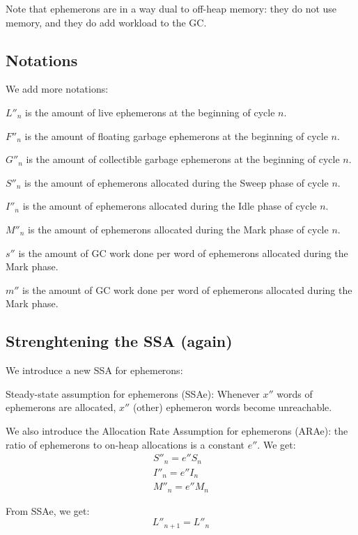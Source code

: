 \documentclass{article}
\begin{document}
Note that ephemerons are in a way dual to off-heap memory: they do not
use memory, and they do add workload to the GC.

\subsection{Notations}

We add more notations:

\bigskip
$L''_n$ is the amount of live ephemerons at the beginning of cycle $n$.

$F''_n$ is the amount of floating garbage ephemerons at the beginning
of cycle $n$.

$G''_n$ is the amount of collectible garbage ephemerons at the
beginning of cycle $n$.

$S''_n$ is the amount of ephemerons allocated during the Sweep phase
of cycle $n$.

$I''_n$ is the amount of ephemerons allocated during the Idle phase
of cycle $n$.

$M''_n$ is the amount of ephemerons allocated during the Mark phase
of cycle $n$.

$s''$ is the amount of GC work done per word of ephemerons allocated
during the Mark phase.

$m''$ is the amount of GC work done per word of ephemerons allocated
during the Mark phase.

\subsection{Strenghtening the SSA (again)}

We introduce a new SSA for ephemerons:

Steady-state assumption for ephemerons (SSAe): Whenever $x''$
words of ephemerons are allocated, $x''$ (other) ephemeron words
become unreachable.

We also introduce the Allocation Rate Assumption for ephemerons
(ARAe): the ratio of ephemerons to on-heap allocations is a constant
$e''$. We get:
\begin{gather}
S''_n = e''S_n \label{eqn-S''} \\
I''_n = e''I_n \label{eqn-I''} \\
M''_n = e''M_n \label{eqn-M''}
\end{gather}

From SSAe, we get:
\begin{equation}
L''_{n+1} = L''_n
\end{equation}
\end{document}
